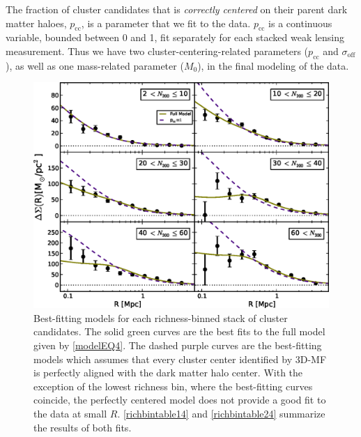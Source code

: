 The fraction of cluster candidates that is {\it correctly centered} on their parent dark matter haloes, $p_{\mathrm{cc}}$, is a parameter that we fit to the data. $p_{\mathrm{cc}}$ is a continuous variable, bounded between 0 and 1, fit separately for each stacked weak lensing measurement. Thus we have two cluster-centering-related parameters ($p_{\mathrm{cc}}$ and $\sigma_{\mathrm{off}}$), as well as one mass-related parameter ($M_0$), in the final modeling of the data.


\begin{figure}
\begin{center}
  \includegraphics[scale=0.9]{plots_ch4/shearFit_panel_fcc0and1_slopeMN1p5_DuttonMaccio.eps}
  \caption[Shear for Richness-Binned Clusters]{Best-fitting models for each richness-binned stack of cluster candidates. The solid green curves are the best fits to the full model given by \autoref{modelEQ4}. The dashed purple curves are the best-fitting models which assumes that every cluster center identified by \ac{3D-MF} is perfectly aligned with the dark matter halo center. With the exception of the lowest richness bin, where the best-fitting curves coincide, the perfectly centered model does not provide a good fit to the data at small $R$. \autoref{richbintable14} and \autoref{richbintable24} summarize the results of both fits.}
\label{plot:nbinned4}
\end{center}
\end{figure}

